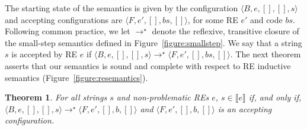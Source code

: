 \documentclass[oneside,12pt]{scrbook}
\newtheorem{Theorem}{Theorem}
\theoremstyle{definition}
\newcommand{\sembrackets}[1]{\ensuremath{\llbracket #1 \rrbracket}}
\newcommand{\conf}[1]{\ensuremath{\langle #1 \rangle}}
\theoremstyle{plain}
\theoremstyle{definition}
\begin{document}
The starting state of the semantics is given by the configuration
$\conf{B,e,[],[],s}$ and accepting configurations are $\conf{F,e',[],bs,[]}$, for some RE $e'$ and code $bs$.
Following common practice, we let $\to^\star$ denote the reflexive, transitive closure of the small-step
semantics defined in Figure~\ref{figure:smallstep}.
We say that a string $s$ is accepted by RE $e$ if $\conf{B,e,[],[],s}\to^\star\conf{F,e',[],bs,[]}$.
The next theorem asserts that our semantics is sound and complete with respect to RE
inductive semantics (Figure~\ref{figure:resemantics}).

\begin{Theorem}
	For all strings $s$ and non-problematic REs $e$, $s\in\sembrackets{e}$ if, and only if, $\conf{B,e,[],[],s}\to^\star\conf{F,e',[],b,[]}$ and
	$\conf{F,e',[],b,[]}$ is an accepting configuration.
\end{Theorem}
\end{document}
